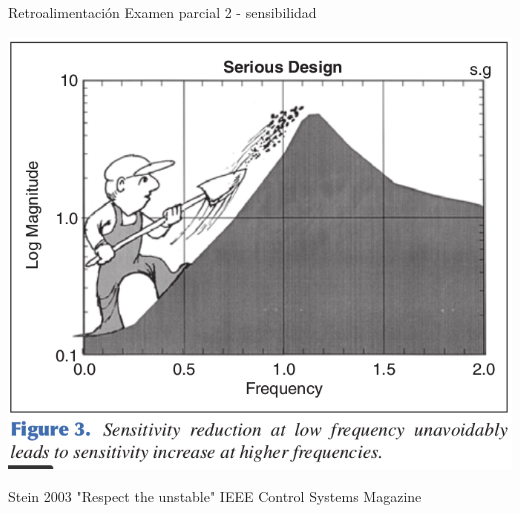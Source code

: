 \documentclass[presentation,aspectratio=169]{beamer}
\begin{document}
\begin{frame}[label={sec:org80a32d3}]{Retroalimentación Examen parcial 2 - sensibilidad}
\begin{center}
\includegraphics[width=0.6\linewidth]{../../figures/stein-serious-design.png}
\end{center}

{\footnotesize Stein 2003 "Respect the unstable" IEEE Control Systems Magazine}
\end{frame}
\end{document}
